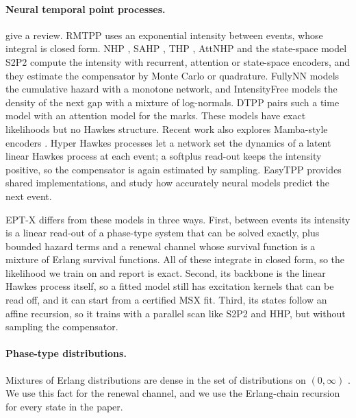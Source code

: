 \paragraph{Neural temporal point processes.} \citet{shchur2021neural} give a review. RMTPP
\citep{du2016recurrent} uses an exponential intensity between events, whose integral is closed
form. NHP \citep{mei2017neural}, SAHP \citep{zhang2020self}, THP \citep{zuo2020transformer},
AttNHP \citep{yang2022transformer} and the state-space model S2P2 \citep{chang2025deep} compute the
intensity with recurrent, attention or state-space encoders, and they estimate the compensator by
Monte Carlo or quadrature. FullyNN \citep{omi2019fully} models the cumulative hazard with a
monotone network, and IntensityFree \citep{shchur2020intensity} models the density of the next gap
with a mixture of log-normals. DTPP \citep{panos2024decomposable} pairs such a time model with an
attention model for the marks. These models have exact likelihoods but no Hawkes structure. Recent
work also explores Mamba-style encoders \citep{gao2024mamba}. Hyper Hawkes processes
\citep{boyd2025hyper} let a network set the dynamics of a latent linear Hawkes process at each
event; a softplus read-out keeps the intensity positive, so the compensator is again estimated by
sampling. EasyTPP \citep{xue2024easytpp} provides shared implementations, and
\citet{bosser2023predictive} study how accurately neural models predict the next event.

EPT-X differs from these models in three ways. First, between events its intensity is a linear
read-out of a phase-type system that can be solved exactly, plus bounded hazard terms and a
renewal channel whose survival function is a mixture of Erlang survival functions. All of these
integrate in closed form, so the likelihood we train on and report is exact. Second, its backbone
is the linear Hawkes process itself, so a fitted model still has excitation kernels that can be
read off, and it can start from a certified MSX fit. Third, its states follow
an affine recursion, so it trains with a parallel scan like S2P2 and HHP, but without sampling the
compensator.

\paragraph{Phase-type distributions.} Mixtures of Erlang distributions are dense in the set of
distributions on $(0,\infty)$ \citep{tijms1994stochastic,lee2010modeling}. We use this fact for
the renewal channel, and we use the Erlang-chain recursion for every state in the paper.
